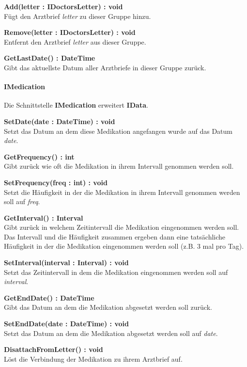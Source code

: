 \documentclass[a4paper]{scrreprt}
\begin{document}
\textbf{Add(letter : IDoctorsLetter) : void}\\
Fügt den Arztbrief \textit{letter} zu dieser Gruppe hinzu.

\textbf{Remove(letter : IDoctorsLetter) : void}\\
Entfernt den Arztbrief \textit{letter} aus dieser Gruppe.

\textbf{GetLastDate() : DateTime}\\
Gibt das aktuellste Datum aller Arztbriefe in dieser Gruppe zurück.

\paragraph{IMedication}
Die Schnittstelle \textbf{IMedication} erweitert \textbf{IData}.

\textbf{SetDate(date : DateTime) : void}\\
Setzt das Datum an dem diese Medikation angefangen wurde auf das Datum \textit{date}.

\textbf{GetFrequency() : int}\\
Gibt zurück wie oft die Medikation in ihrem Intervall genommen werden soll.

\textbf{SetFrequency(freq : int) : void}\\
Setzt die Häufigkeit in der die Medikation in ihrem Intervall genommen werden soll auf \textit{freq}.

\textbf{GetInterval() : Interval}\\
Gibt zurück in welchem Zeitintervall die Medikation eingenommen werden soll. Das Intervall und die Häufigkeit zusammen ergeben dann eine tatsächliche Häufigkeit in der die Medikation eingenommen werden soll (z.B. 3 mal pro Tag).

\textbf{SetInterval(interval : Interval) : void}\\
Setzt das Zeitintervall in dem die Medikation eingenommen werden soll auf \textit{interval}.

\textbf{GetEndDate() : DateTime}\\
Gibt das Datum an dem die Medikation abgesetzt werden soll zurück.

\textbf{SetEndDate(date : DateTime) : void}\\
Setzt das Datum an dem die Medikation abgesetzt werden soll auf \textit{date}.

\textbf{DisattachFromLetter() : void}\\
Löst die Verbindung der Medikation zu ihrem Arztbrief auf.
\end{document}

